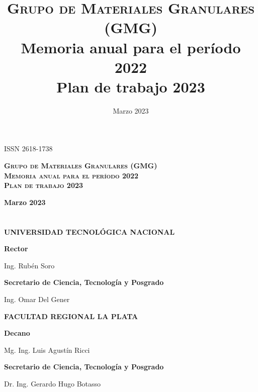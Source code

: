 \documentclass[a4paper,11pt,twoside,final,titlepage,onecolumn,openright]{report}
\begin{document}
\title{\textsc{Grupo de Materiales Granulares (GMG)} \\ Memoria anual para el período 2022 \\ Plan de trabajo 2023}
\date{Marzo 2023}


\chapter*{}

\begin{flushright}
 ISSN 2618-1738
\end{flushright}

\vspace{5cm}
\begin{center}

\textbf{\LARGE \textsc{Grupo de Materiales Granulares (GMG)} \\[1em] \textsc{Memoria anual para el período 2022} \\[1em] \textsc{Plan de trabajo 2023}}

\vspace{1cm}
\textbf{\Large Marzo 2023}
\end{center}


\chapter*{}

\begin{center}

\textbf{\LARGE UNIVERSIDAD TECNOLÓGICA NACIONAL} 

\vspace{1cm}
\textbf{\Large Rector}

Ing. Rubén Soro

\vspace{0.5cm}
\textbf{\Large Secretario de Ciencia, Tecnología y Posgrado} 

Ing. Omar Del Gener

\vspace{5cm}

\textbf{\LARGE FACULTAD REGIONAL LA PLATA} 

\vspace{1cm}
\textbf{\Large Decano} 

Mg. Ing. Luis Agustín Ricci

\vspace{0.5cm}
\textbf{\Large Secretario de Ciencia, Tecnología y Posgrado}

Dr. Ing. Gerardo Hugo Botasso
 
\end{center}
\end{document}
